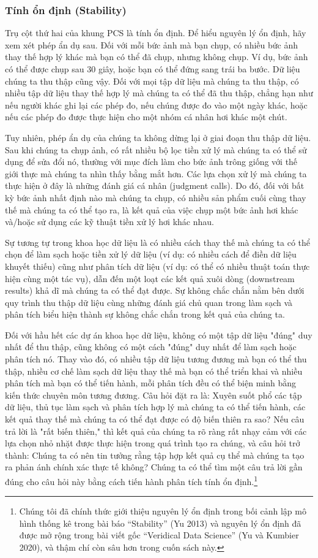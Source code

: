 \subsubsection{Tính ổn định (Stability)}
Trụ cột thứ hai của khung PCS là tính ổn định. Để hiểu nguyên lý ổn định, hãy xem xét phép ẩn dụ sau. Đối với mỗi bức ảnh mà bạn chụp, có nhiều bức ảnh thay thế hợp lý khác mà bạn có thể đã chụp, nhưng không chụp. Ví dụ, bức ảnh có thể được chụp sau 30 giây, hoặc bạn có thể đứng sang trái ba bước. Dữ liệu chúng ta thu thập cũng vậy. Đối với mọi tập dữ liệu mà chúng ta thu thập, có nhiều tập dữ liệu thay thế hợp lý mà chúng ta có thể đã thu thập, chẳng hạn như nếu người khác ghi lại các phép đo, nếu chúng được đo vào một ngày khác, hoặc nếu các phép đo được thực hiện cho một nhóm cá nhân hơi khác một chút.

Tuy nhiên, phép ẩn dụ của chúng ta không dừng lại ở giai đoạn thu thập dữ liệu. Sau khi chúng ta chụp ảnh, có rất nhiều bộ lọc tiền xử lý mà chúng ta có thể sử dụng để sửa đổi nó, thường với mục đích làm cho bức ảnh trông giống với thế giới thực mà chúng ta nhìn thấy bằng mắt hơn. Các lựa chọn xử lý mà chúng ta thực hiện ở đây là những đánh giá cá nhân (judgment calls). Do đó, đối với bất kỳ bức ảnh nhất định nào mà chúng ta chụp, có nhiều sản phẩm cuối cùng thay thế mà chúng ta có thể tạo ra, là kết quả của việc chụp một bức ảnh hơi khác và/hoặc sử dụng các kỹ thuật tiền xử lý hơi khác nhau.

Sự tương tự trong khoa học dữ liệu là có nhiều cách thay thế mà chúng ta có thể chọn để làm sạch hoặc tiền xử lý dữ liệu (ví dụ: có nhiều cách để điền dữ liệu khuyết thiếu) cũng như phân tích dữ liệu (ví dụ: có thể có nhiều thuật toán thực hiện cùng một tác vụ), dẫn đến một loạt các kết quả xuôi dòng (downstream results) khả dĩ mà chúng ta có thể đạt được. Sự không chắc chắn nằm bên dưới quy trình thu thập dữ liệu cùng những đánh giá chủ quan trong làm sạch và phân tích biểu hiện thành sự không chắc chắn trong kết quả của chúng ta.

Đối với hầu hết các dự án khoa học dữ liệu, không có một tập dữ liệu "đúng" duy nhất để thu thập, cũng không có một cách "đúng" duy nhất để làm sạch hoặc phân tích nó. Thay vào đó, có nhiều tập dữ liệu tương đương mà bạn có thể thu thập, nhiều cơ chế làm sạch dữ liệu thay thế mà bạn có thể triển khai và nhiều phân tích mà bạn có thể tiến hành, mỗi phân tích đều có thể biện minh bằng kiến thức chuyên môn tương đương. Câu hỏi đặt ra là: Xuyên suốt phổ các tập dữ liệu, thủ tục làm sạch và phân tích hợp lý mà chúng ta có thể tiến hành, các kết quả thay thế mà chúng ta có thể đạt được có độ biến thiên ra sao? Nếu câu trả lời là "rất biến thiên," thì kết quả của chúng ta rõ ràng rất nhạy cảm với các lựa chọn nhỏ nhặt được thực hiện trong quá trình tạo ra chúng, và câu hỏi trở thành: Chúng ta có nên tin tưởng rằng tập hợp kết quả cụ thể mà chúng ta tạo ra phản ánh chính xác thực tế không? Chúng ta có thể tìm một câu trả lời gần đúng cho câu hỏi này bằng cách tiến hành phân tích tính ổn định.\footnote{Chúng tôi đã chính thức giới thiệu nguyên lý ổn định trong bối cảnh lập mô hình thống kê trong bài báo “Stability” (Yu 2013) và nguyên lý ổn định đã được mở rộng trong bài viết gốc “Veridical Data Science” (Yu và Kumbier 2020), và thậm chí còn sâu hơn trong cuốn sách này.}


